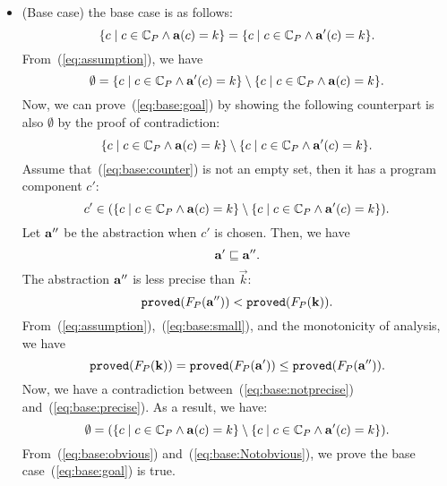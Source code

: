 \begin{itemize}
\item (Base case) the base case is as follows:
\begin{equation}\label{eq:base:goal}
\{c \mid c\in \mathbb{C}_P \land {\bf a}(c) = k\} = \{c \mid c\in \mathbb{C}_P \land {\bf a}'(c) = k\}.
\end{equation}
From~(\ref{eq:assumption}), we have
\begin{equation}\label{eq:base:obvious}
\emptyset = \{c \mid c\in \mathbb{C}_P \land {\bf a}'(c) = k\} \setminus \{c \mid c\in \mathbb{C}_P \land {\bf a}(c) = k\}.
\end{equation}
Now, we can prove~(\ref{eq:base:goal}) by showing the following counterpart is also $\emptyset$ by the proof of contradiction:
\begin{equation}\label{eq:base:counter}
\{c \mid c\in \mathbb{C}_P \land {\bf a}(c) = k\} \setminus \{c \mid c\in \mathbb{C}_P \land {\bf a}'(c) = k\}.
\end{equation}
Assume that~(\ref{eq:base:counter}) is not an empty set, then it has a program component $c'$:
\[
c' \in (\{c \mid c\in \mathbb{C}_P \land {\bf a}(c) = k\} \setminus \{c \mid c\in \mathbb{C}_P \land {\bf a}'(c) = k\}).
\]
Let ${\bf a}''$ be the abstraction when $c'$ is chosen.
Then, we have
\begin{equation}\label{eq:base:small}
 {\bf a}'\sqsubseteq {\bf a}''.
\end{equation}
The abstraction ${\bf a}''$ is less precise than $\vec{k}$:
\begin{equation}\label{eq:base:notprecise}
{\tt proved}(F_P({\bf a}''))<{\tt proved}(F_P({\bf k})).
\end{equation}
From~(\ref{eq:assumption}),~(\ref{eq:base:small}), and the monotonicity of analysis, we have
\begin{equation}\label{eq:base:precise}
{\tt proved}(F_P({\bf k})) = {\tt proved}(F_P({\bf a}')) \le {\tt proved}(F_P({\bf a}'')).
\end{equation}
Now, we have a contradiction between~(\ref{eq:base:notprecise}) and~(\ref{eq:base:precise}).
As a result, we have:
\begin{equation}\label{eq:base:Notobvious}
\emptyset = (\{c \mid c\in \mathbb{C}_P \land {\bf a}(c) = k\} \setminus \{c \mid c\in \mathbb{C}_P \land {\bf a}'(c) = k\}).
\end{equation}
From~(\ref{eq:base:obvious}) and~(\ref{eq:base:Notobvious}), we prove the base case~(\ref{eq:base:goal}) is true.\\


\end{itemize}
